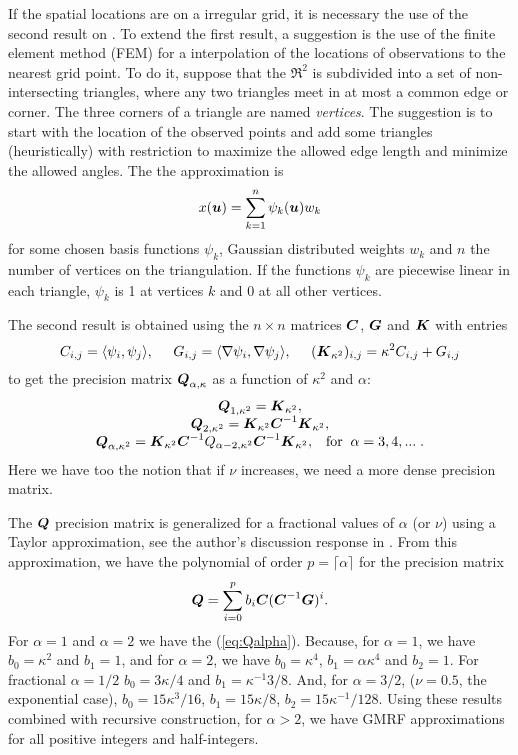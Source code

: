 If the spatial locations are on a irregular grid, 
it is necessary the use of the second result on
\cite{lindgrenRL:2011}. 
To extend the first result, a suggestion is the use of 
the finite element method (FEM) for a interpolation of 
the locations of observations to the nearest grid point. 
To do it, suppose that the $\Re^2$ is subdivided into 
a set of non-intersecting triangles, where any two
triangles meet in at most a common edge or corner. 
The three corners of a triangle are named \textit{vertices}.
The suggestion is to start with the location of the 
observed points and add some triangles (heuristically) 
with restriction to maximize the allowed edge length 
and minimize the allowed angles. 
The the approximation is 
\[x(\mbox{\protect \boldmath $u$}) = \sum_{k=1}^{n}\psi_k(\mbox{\protect \boldmath $u$})w_k\]
for some chosen basis functions {$\psi_k$}, 
Gaussian distributed weights $w_k$ and $n$ the 
number of vertices on the triangulation.
If the functions $\psi_k$ are piecewise linear in each 
triangle, $\psi_k$ is 1 at vertices $k$ and 0 at all 
other vertices. 

The second result is obtained using the $n\times n$ matrices 
$\mbox{\protect \boldmath $C$}$, $\mbox{\protect \boldmath $G$}$ and $\mbox{\protect \boldmath $K$}$ with entries 
\begin{equation}
C_{i,j} = \langle \psi_i, \psi_j\rangle, \;\;\;\;\;
G_{i,j} = \langle \nabla \psi_i, \nabla \psi_j \rangle, \;\;\;\;\;
(\mbox{\protect \boldmath $K$}_{\kappa^2})_{i,j} = \kappa^2 C_{i,j} + G_{i,j}
\end{equation}
to get the precision matrix $\mbox{\protect \boldmath $Q$}_{\alpha,\kappa}$ 
as a function of $\kappa^2$ and $\alpha$: 
\begin{equation}\label{eq:Qalpha}\begin{array}{c}
\mbox{\protect \boldmath $Q$}_{1,\kappa^2} = \mbox{\protect \boldmath $K$}_{\kappa^2}, \\
\mbox{\protect \boldmath $Q$}_{2,\kappa^2} = \mbox{\protect \boldmath $K$}_{\kappa^2}\mbox{\protect \boldmath $C$}^{-1}\mbox{\protect \boldmath $K$}_{\kappa^2}, \\
\mbox{\protect \boldmath $Q$}_{\alpha,\kappa^2} = \mbox{\protect \boldmath $K$}_{\kappa^2}\mbox{\protect \boldmath $C$}^{-1}Q_{\alpha-2,\kappa^2}\mbox{\protect \boldmath $C$}^{-1}\mbox{\protect \boldmath $K$}_{\kappa^2}, 
\;\;\;\mbox{for} \;\;\alpha = 3,4,...\;.
\end{array}\end{equation}
Here we have too the notion that if $\nu$ increases, 
we need a more dense precision matrix. 

The $\mbox{\protect \boldmath $Q$}$ precision matrix is generalized for a fractional values 
of $\alpha$ (or $\nu$) using a Taylor approximation, 
see the author's discussion response in \cite{lindgrenRL:2011}. 
From this approximation, we have the polynomial of 
order $p=\lceil \alpha \rceil$ for the precision matrix 
\begin{equation}\label{eq:Qfrac}
\mbox{\protect \boldmath $Q$} = \sum_{i=0}^p b_i \mbox{\protect \boldmath $C$}(\mbox{\protect \boldmath $C$}^{-1}\mbox{\protect \boldmath $G$})^i.
\end{equation}
For $\alpha=1$ and $\alpha=2$ we have the (\ref{eq:Qalpha}). 
Because, for $\alpha=1$, we have $b_0=\kappa^2$ and $b_1=1$, 
and for $\alpha=2$, we have $b_0=\kappa^4$, 
$b_1=\alpha\kappa^4$ and $b_2=1$. 
For fractional $\alpha=1/2$ 
$b_0=3\kappa/4$ and $b_1=\kappa^{-1}3/8$. 
And, for $\alpha=3/2$, ($\nu=0.5$, the exponential case), 
$b_0=15\kappa^3/16$, $b_1=15\kappa/8$, 
$b_2=15\kappa^{-1}/128$. 
Using these results combined with recursive construction, 
for $\alpha>2$, we have GMRF approximations for all positive 
integers and half-integers. 
